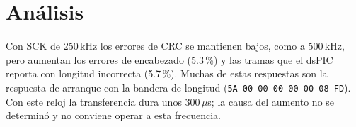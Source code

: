 \section{Análisis}

Con SCK de 250\,kHz los errores de CRC se mantienen bajos, como a 500\,kHz,
pero aumentan los errores de encabezado (5.3\,\%) y las tramas que el dsPIC
reporta con longitud incorrecta (5.7\,\%). Muchas de estas respuestas son la
respuesta de arranque con la bandera de longitud
(\texttt{5A 00 00 00 00 00 08 FD}). Con este reloj la transferencia dura unos
300\,$\mu$s; la causa del aumento no se determinó y no conviene operar a esta
frecuencia.

